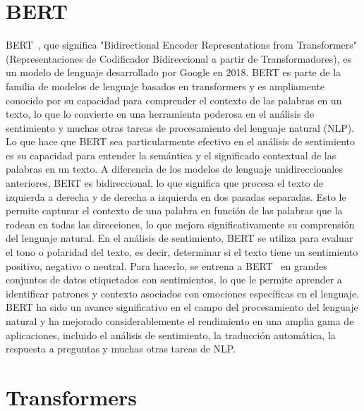 
\section{BERT}

BERT~\cite{devlin2019bert}, que significa "Bidirectional Encoder Representations from Transformers" (Representaciones de Codificador Bidireccional a partir de Transformadores), es un modelo de lenguaje desarrollado por Google en 2018. BERT es parte de la familia de modelos de lenguaje basados en transformers y es ampliamente conocido por su capacidad para comprender el contexto de las palabras en un texto, lo que lo convierte en una herramienta poderosa en el análisis de sentimiento y muchas otras tareas de procesamiento del lenguaje natural (NLP).
Lo que hace que BERT sea particularmente efectivo en el análisis de sentimiento es su capacidad para entender la semántica y el significado contextual de las palabras en un texto. A diferencia de los modelos de lenguaje unidireccionales anteriores, BERT es bidireccional, lo que significa que procesa el texto de izquierda a derecha y de derecha a izquierda en dos pasadas separadas. Esto le permite capturar el contexto de una palabra en función de las palabras que la rodean en todas las direcciones, lo que mejora significativamente su comprensión del lenguaje natural.
En el análisis de sentimiento, BERT se utiliza para evaluar el tono o polaridad del texto, es decir, determinar si el texto tiene un sentimiento positivo, negativo o neutral. Para hacerlo, se entrena a BERT~\cite{BertSentimentModel1} en grandes conjuntos de datos etiquetados con sentimientos, lo que le permite aprender a identificar patrones y contexto asociados con emociones específicas en el lenguaje.
BERT ha sido un avance significativo en el campo del procesamiento del lenguaje natural y ha mejorado considerablemente el rendimiento en una amplia gama de aplicaciones, incluido el análisis de sentimiento, la traducción automática, la respuesta a preguntas y muchas otras tareas de NLP.


\section{Transformers}

